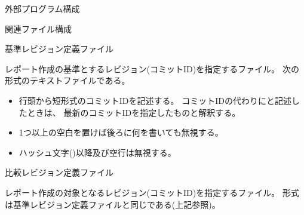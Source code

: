 \bigskip
\noindent
外部プログラム構成

\vspace{-12pt}
\noindent
\begin{narrow}
    \begin{narrow}\begin{minipage}{.8\textwidth}
  \end{minipage}\end{narrow}
  \medskip
\end{narrow}

\bigskip
\noindent
関連ファイル構成

\vspace{-12pt}
\noindent
\begin{narrow}
    \begin{narrow}\begin{minipage}{.8\textwidth}
  \end{minipage}\end{narrow}
  \bigskip
  \noindent
  基準レビジョン定義ファイル
  \begin{narrow}
  	レポート作成の基準とするレビジョン(コミットID)を指定するファイル。
	次の形式のテキストファイルである。
	\begin{itemize}
	  \item	行頭から短形式のコミットIDを記述する。
	  	コミットIDの代わりにと記述したときは、
		最新のコミットIDを指定したものと解釈する。
	  \item	1つ以上の空白を置けば後ろに何を書いても無視する。
	  \item	ハッシュ文字(\SQuote{\tt{\#}})以降及び空行は無視する。
	\end{itemize}
  \end{narrow}
  \noindent
  比較レビジョン定義ファイル
  \begin{narrow}
  	レポート作成の対象となるレビジョン(コミットID)を指定するファイル。
	形式は基準レビジョン定義ファイルと同じである(上記参照)。
  \end{narrow}
\end{narrow}

